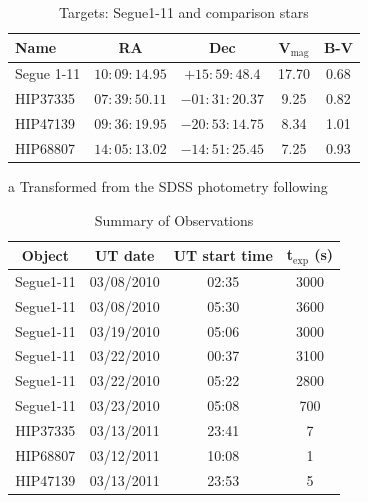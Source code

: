 \documentclass[manuscript]{aastex}
\begin{document}
\begin{table}
 \begin{threeparttable}
 \begin{center}
   \caption{Targets: Segue1-11 and comparison stars}
   \label{tab:targets}
   \begin{tabular}{l c c c c}
     \hline \hline
       Name       &  RA            & Dec             & V$_{\mbox{mag}}$ & B-V       \\ \hline  
       Segue 1-11 &  $10:09:14.95$ &  $+15:59:48.4$  & 17.70\tnote{a}   &  0.68\tnote{a}       \\
       HIP37335   &  $07:39:50.11$ &  $-01:31:20.37$ & 9.25             &  0.82       \\
       HIP47139   &  $09:36:19.95$ &  $-20:53:14.75$ & 8.34             &  1.01       \\
       HIP68807   &  $14:05:13.02$ &  $-14:51:25.45$ & 7.25             &  0.93       \\ \hline    
  \end{tabular}
  \begin{tablenotes}
   \item[a]{Transformed from the SDSS photometry following \citet{Jordi2006}}
  \end{tablenotes}
 \end{center}
\end{threeparttable}
\end{table}


\begin{table}
 \begin{center}
   \caption{Summary of Observations}
   \label{tab:segobs}
   \begin{tabular}{c c c c }
     \hline \hline
       Object    &  UT date    & UT start time & t$_{\mbox{exp}}$ (s)   \\ \hline  
       Segue1-11 &  03/08/2010 & 02:35         & 3000            \\
       Segue1-11 &  03/08/2010 & 05:30         & 3600            \\
       Segue1-11 &  03/19/2010 & 05:06         & 3000            \\
       Segue1-11 &  03/22/2010 & 00:37         & 3100            \\
       Segue1-11 &  03/22/2010 & 05:22         & 2800            \\
       Segue1-11 &  03/23/2010 & 05:08         & 700             \\
       HIP37335  &  03/13/2011 & 23:41         &  7              \\
       HIP68807  &  03/12/2011 & 10:08         &  1              \\
       HIP47139  &  03/13/2011 & 23:53         &  5              \\
      \hline
  \end{tabular}
 \end{center}
\end{table}
\end{document}
